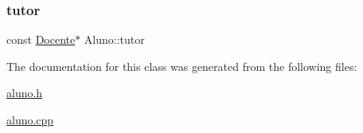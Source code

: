 \hypertarget{class_aluno_a0569ac677617ba6b9fc420830bc21bf6}{}\label{class_aluno_a0569ac677617ba6b9fc420830bc21bf6} 
\subsubsection{\texorpdfstring{tutor}{tutor}}
{\footnotesize\ttfamily const \hyperlink{class_docente}{Docente}$\ast$ Aluno\+::tutor\hspace{0.3cm}{\ttfamily [private]}}



The documentation for this class was generated from the following files\+:\begin{DoxyCompactItemize}
\item 
\hyperlink{aluno_8h}{aluno.\+h}\item 
\hyperlink{aluno_8cpp}{aluno.\+cpp}\end{DoxyCompactItemize}
